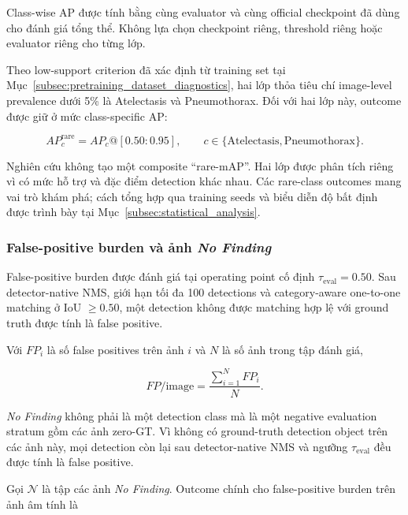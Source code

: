 \documentclass[pdflatex,sn-mathphys-num]{sn-jnl}%
\theoremstyle{thmstyleone}%
\theoremstyle{thmstyletwo}%
\theoremstyle{thmstylethree}%
\begin{document}
Class-wise AP được tính bằng cùng evaluator và cùng official checkpoint
đã dùng cho đánh giá tổng thể. Không lựa chọn checkpoint riêng, threshold
riêng hoặc evaluator riêng cho từng lớp.

Theo low-support criterion đã xác định từ training set tại
Mục~\ref{subsec:pretraining_dataset_diagnostics}, hai lớp thỏa tiêu chí
image-level prevalence dưới 5\% là Atelectasis và Pneumothorax. Đối với
hai lớp này, outcome được giữ ở mức class-specific AP:

\begin{equation}
AP^{\mathrm{rare}}_c
=
AP_c@[0.50:0.95],
\qquad
c\in
\{\mathrm{Atelectasis},\mathrm{Pneumothorax}\}.
\label{eq:rare_class_ap}
\end{equation}

Nghiên cứu không tạo một composite ``rare-mAP''. Hai lớp được phân tích
riêng vì có mức hỗ trợ và đặc điểm detection khác nhau. Các rare-class
outcomes mang vai trò khám phá; cách tổng hợp qua training seeds và biểu
diễn độ bất định được trình bày tại
Mục~\ref{subsec:statistical_analysis}.

\subsubsection{False-positive burden và ảnh \textit{No Finding}}
\label{subsubsec:false_positive_metrics}
\label{subsubsec:no_finding_metrics}

False-positive burden được đánh giá tại operating point cố định
\(\tau_{\mathrm{eval}}=0.50\). Sau detector-native NMS, giới hạn tối đa
100 detections và category-aware one-to-one matching ở IoU \(\geq0.50\),
một detection không được matching hợp lệ với ground truth được tính là
false positive.

Với \(FP_i\) là số false positives trên ảnh \(i\) và \(N\) là số ảnh trong
tập đánh giá,

\begin{equation}
FP/\mathrm{image}
=
\frac{\sum_{i=1}^{N}FP_i}{N}.
\label{eq:fp_per_image}
\end{equation}

\textit{No Finding} không phải là một detection class mà là một negative
evaluation stratum gồm các ảnh zero-GT. Vì không có ground-truth detection
object trên các ảnh này, mọi detection còn lại sau detector-native NMS và
ngưỡng \(\tau_{\mathrm{eval}}\) đều được tính là false positive.

Gọi \(\mathcal{N}\) là tập các ảnh \textit{No Finding}. Outcome chính cho
false-positive burden trên ảnh âm tính là
\end{document}
